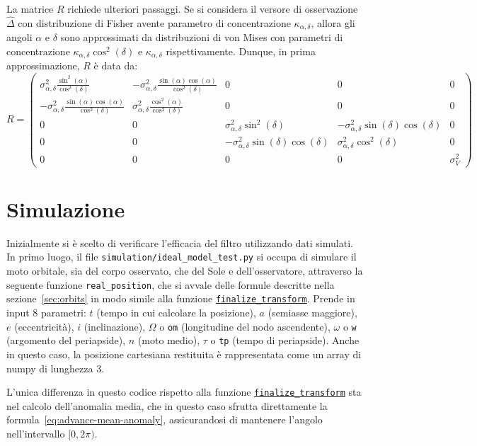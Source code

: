 \documentclass[12pt,a4paper,openright,twoside]{book}
\begin{document}
La matrice $R$ richiede ulteriori passaggi. Se si considera il versore di osservazione $\hat{\Delta}$ con distribuzione di Fisher avente parametro di concentrazione $\kappa_{\alpha,\delta}$, allora gli angoli $\alpha$ e $\delta$ sono approssimati da distribuzioni di von Mises con parametri di concentrazione $\kappa_{\alpha,\delta}\cos^2(\delta)$ e $\kappa_{\alpha,\delta}$ rispettivamente. Dunque, in prima approssimazione, $R$ è data da:
\begin{equation}
R=\left(\begin{smallmatrix}
\sigma_{\alpha,\delta}^2\tfrac{\sin^2(\alpha)}{\cos^2(\delta)} & -\sigma_{\alpha,\delta}^2\tfrac{\sin(\alpha)\cos(\alpha)}{\cos^2(\delta)} & 0 & 0 & 0 \\
-\sigma_{\alpha,\delta}^2\tfrac{\sin(\alpha)\cos(\alpha)}{\cos^2(\delta)} & \sigma_{\alpha,\delta}^2\tfrac{\cos^2(\alpha)}{\cos^2(\delta)} & 0 & 0 & 0 \\
0 & 0 & \sigma_{\alpha,\delta}^2\sin^2(\delta) & -\sigma_{\alpha,\delta}^2\sin(\delta)\cos(\delta) & 0 \\
0 & 0 & -\sigma_{\alpha,\delta}^2\sin(\delta)\cos(\delta) & \sigma_{\alpha,\delta}^2\cos^2(\delta) & 0 \\
0 & 0 & 0 & 0 & \sigma_V^2
\end{smallmatrix}\right)
\end{equation}

\section{Simulazione}

Inizialmente si è scelto di verificare l'efficacia del filtro utilizzando dati simulati. In primo luogo, il file \lstinline{simulation/ideal_model_test.py} si occupa di simulare il moto orbitale, sia del corpo osservato, che del Sole e dell'osservatore, attraverso la seguente funzione \lstinline{real_position}, che si avvale delle formule descritte nella sezione~\ref{sec:orbits} in modo simile alla funzione \hyperref[lst:finalize-transform]{\lstinline{finalize_transform}}. Prende in input 8 parametri: $t$ (tempo in cui calcolare la posizione), $a$ (semiasse maggiore), $e$ (eccentricità), $i$ (inclinazione), $\Omega$ o \lstinline{om} (longitudine del nodo ascendente), $\omega$ o \lstinline{w} (argomento del periapside), $n$ (moto medio), $\tau$ o \lstinline{tp} (tempo di periapside). Anche in questo caso, la posizione cartesiana restituita è rappresentata come un array di numpy di lunghezza 3.

L'unica differenza in questo codice rispetto alla funzione \hyperref[lst:finalize-transform]{\lstinline{finalize_transform}} sta nel calcolo dell'anomalia media, che in questo caso sfrutta direttamente la formula~\ref{eq:advance-mean-anomaly}, assicurandosi di mantenere l'angolo nell'intervallo $[0,2\pi)$. \\
\end{document}
